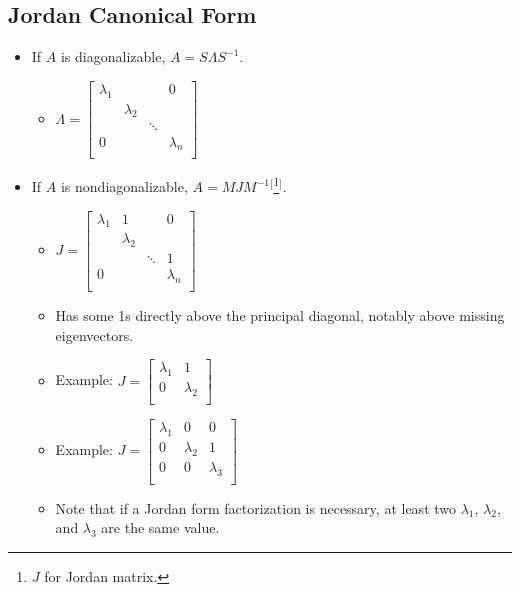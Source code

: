 \documentclass{article}
\begin{document}
\subsection*{Jordan Canonical Form}
\begin{itemize}
    \item {}If $A$ is diagonalizable, $A=S\Lambda S^{-1}$.
    \begin{itemize}
        \item $
            \Lambda=
            \begin{bmatrix}
                \lambda_1 & & & 0\\
                 & \lambda_2 & & \\
                 & & \ddots & \\
                0 & & & \lambda_n\\
            \end{bmatrix}
        $
    \end{itemize}
    \item If $A$ is nondiagonalizable, $A=MJM^{-1}$$^[$\footnote{$J$ for Jordan matrix.}$^]$.
    \begin{itemize}
        \item $
            J=
            \begin{bmatrix}
                \lambda_1 & 1 & & 0\\
                 & \lambda_2 & &\\
                 &  & \ddots & 1\\
                0 &  &  & \lambda_n\\
            \end{bmatrix}
        $
        \item Has some 1s directly above the principal diagonal, notably above missing eigenvectors.
        \item Example: $
            J =
            \begin{bmatrix}
                \lambda_1 & 1\\
                0 & \lambda_2\\
            \end{bmatrix}
        $
        \item Example: $
            J =
            \begin{bmatrix}
                \lambda_1 & 0 & 0\\
                0 & \lambda_2 & 1\\
                0 & 0 & \lambda_3\\
            \end{bmatrix}
        $
        \item Note that if a Jordan form factorization is necessary, at least two $\lambda_1$, $\lambda_2$, and $\lambda_3$ are the same value. 
    \end{itemize}
\end{itemize}
\end{document}
